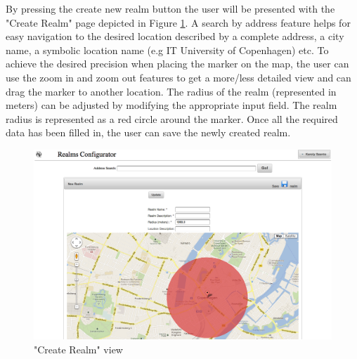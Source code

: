\noindent By pressing the create new realm button the user will be presented with the "Create Realm" page depicted in Figure \ref{fig.new_realm}. A search by address feature helps for easy navigation to the desired location described by a complete address, a city name, a symbolic location name (e.g IT University of Copenhagen) etc. To achieve the desired precision when placing the marker on the map, the user can use the zoom in and zoom out features to get a more/less detailed view and can drag the marker to another location. The radius of the realm (represented in meters) can be adjusted by modifying the appropriate input field. The realm radius is represented as a red circle around the marker. Once all the required data has been filled in, the user can save the newly created realm.
\begin{figure}[H] 
	\centering
	\includegraphics[width=\linewidth]{fig/new_realm.png}
	\caption{"Create Realm" view}
	\label{fig.new_realm}
\end{figure}
\\

